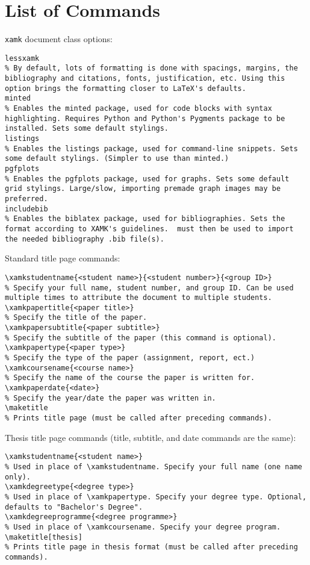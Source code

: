 \section{List of Commands}

\texttt{xamk} document class options:
\begin{verbatim}
lessxamk
% By default, lots of formatting is done with spacings, margins, the bibliography and citations, fonts, justification, etc. Using this option brings the formatting closer to LaTeX's defaults.
minted
% Enables the minted package, used for code blocks with syntax highlighting. Requires Python and Python's Pygments package to be installed. Sets some default stylings.
listings
% Enables the listings package, used for command-line snippets. Sets some default stylings. (Simpler to use than minted.)
pgfplots
% Enables the pgfplots package, used for graphs. Sets some default grid stylings. Large/slow, importing premade graph images may be preferred.
includebib
% Enables the biblatex package, used for bibliographies. Sets the format according to XAMK's guidelines.  must then be used to import the needed bibliography .bib file(s).
\end{verbatim}
%
Standard title page commands:
\begin{verbatim}
\xamkstudentname{<student name>}{<student number>}{<group ID>}
% Specify your full name, student number, and group ID. Can be used multiple times to attribute the document to multiple students.
\xamkpapertitle{<paper title>}
% Specify the title of the paper.
\xamkpapersubtitle{<paper subtitle>}
% Specify the subtitle of the paper (this command is optional).
\xamkpapertype{<paper type>}
% Specify the type of the paper (assignment, report, ect.)
\xamkcoursename{<course name>}
% Specify the name of the course the paper is written for.
\xamkpaperdate{<date>}
% Specify the year/date the paper was written in.
\maketitle
% Prints title page (must be called after preceding commands).
\end{verbatim}
%
Thesis title page commands (title, subtitle, and date commands are the same):
\begin{verbatim}
\xamkstudentname{<student name>}
% Used in place of \xamkstudentname. Specify your full name (one name only).
\xamkdegreetype{<degree type>}
% Used in place of \xamkpapertype. Specify your degree type. Optional, defaults to "Bachelor's Degree".
\xamkdegreeprogramme{<degree programme>}
% Used in place of \xamkcoursename. Specify your degree program.
\maketitle[thesis]
% Prints title page in thesis format (must be called after preceding commands).
\end{verbatim}
